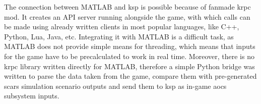         The connection between MATLAB and \ac{ksp} is possible because of fanmade \ac{krpc} mod. It creates an API server running alongside the game, with which calls can be made using already written clients in most popular languages, like C++, Python, Lua, Java, etc. Integrating it with MATLAB is a difficult task, as MATLAB does not provide simple means for threading, which means that inputs for the game have to be precalculated to work in real time. Moreover, there is no \ac{krpc} library written directly for MATLAB, therefore a simple Python bridge was written to parse the data taken from the game, compare them with pre-generated \ac{scars} simulation scenario outputs and send them to \ac{ksp} as in-game \ac{aocs} subsystem inputs.
